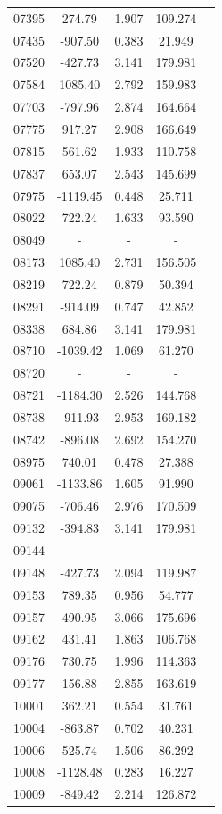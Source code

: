 {\begin{longtable}{ccccc}
07395 & 274.79 & 1.907 & 109.274\\
07435 & -907.50 & 0.383 & 21.949\\
07520 & -427.73 & 3.141 & 179.981\\
07584 & 1085.40 & 2.792 & 159.983\\
07703 & -797.96 & 2.874 & 164.664\\
07775 & 917.27 & 2.908 & 166.649\\
07815 & 561.62 & 1.933 & 110.758\\
07837 & 653.07 & 2.543 & 145.699\\
07975 & -1119.45 & 0.448 & 25.711\\
08022 & 722.24 & 1.633 & 93.590\\
08049 & - & - & - \\
08173 & 1085.40 & 2.731 & 156.505\\
08219 & 722.24 & 0.879 & 50.394\\
08291 & -914.09 & 0.747 & 42.852\\
08338 & 684.86 & 3.141 & 179.981\\
08710 & -1039.42 & 1.069 & 61.270\\
08720 & - & - & - \\
08721 & -1184.30 & 2.526 & 144.768\\
08738 & -911.93 & 2.953 & 169.182\\
08742 & -896.08 & 2.692 & 154.270\\
08975 & 740.01 & 0.478 & 27.388\\
09061 & -1133.86 & 1.605 & 91.990\\
09075 & -706.46 & 2.976 & 170.509\\
09132 & -394.83 & 3.141 & 179.981\\
09144 & - & - & - \\
09148 & -427.73 & 2.094 & 119.987\\
09153 & 789.35 & 0.956 & 54.777\\
09157 & 490.95 & 3.066 & 175.696\\
09162 & 431.41 & 1.863 & 106.768\\
09176 & 730.75 & 1.996 & 114.363\\
09177 & 156.88 & 2.855 & 163.619\\
10001 & 362.21 & 0.554 & 31.761\\
10004 & -863.87 & 0.702 & 40.231\\
10006 & 525.74 & 1.506 & 86.292\\
10008 & -1128.48 & 0.283 & 16.227\\
10009 & -849.42 & 2.214 & 126.872\\

\end{longtable}}
